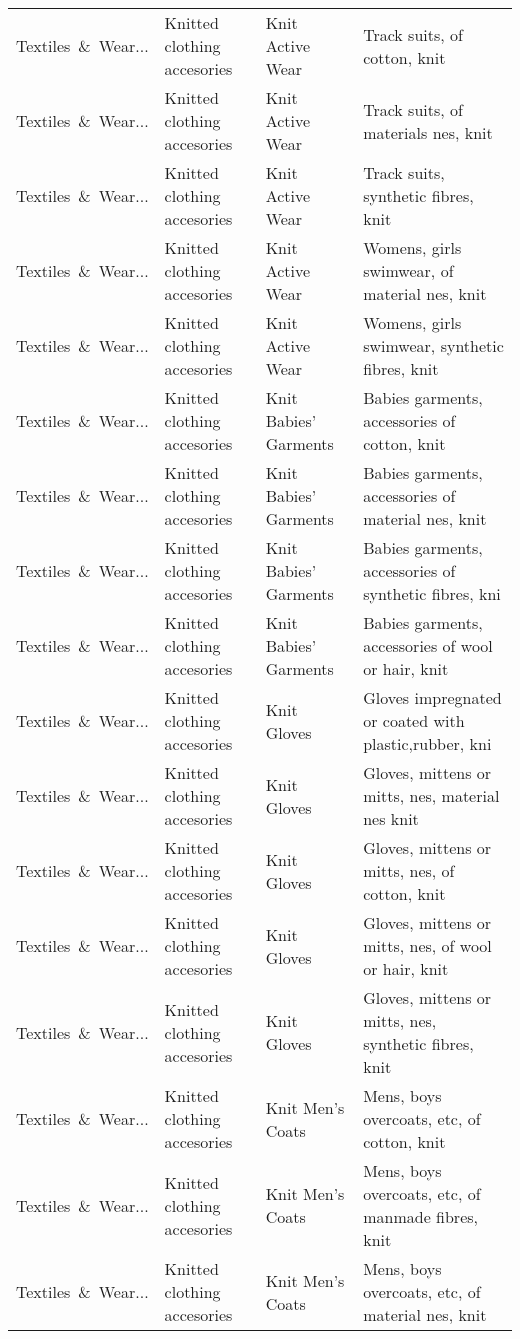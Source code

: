 \begin{appendices}
\begin{xltabular}{\textwidth}{|p{0.10\textwidth}|p{0.25\textwidth}|p{0.24\textwidth}|p{0.31\textwidth}|}
Textiles\ \&\ Wear... & Knitted clothing accesories & Knit Active Wear & Track suits, of cotton, knit \\
Textiles\ \&\ Wear... & Knitted clothing accesories & Knit Active Wear & Track suits, of materials nes, knit \\
Textiles\ \&\ Wear... & Knitted clothing accesories & Knit Active Wear & Track suits, synthetic fibres, knit \\
Textiles\ \&\ Wear... & Knitted clothing accesories & Knit Active Wear & Womens, girls swimwear, of material nes, knit \\
Textiles\ \&\ Wear... & Knitted clothing accesories & Knit Active Wear & Womens, girls swimwear, synthetic fibres, knit \\
Textiles\ \&\ Wear... & Knitted clothing accesories & Knit Babies' Garments & Babies garments, accessories of cotton, knit \\
Textiles\ \&\ Wear... & Knitted clothing accesories & Knit Babies' Garments & Babies garments, accessories of material nes, knit \\
Textiles\ \&\ Wear... & Knitted clothing accesories & Knit Babies' Garments & Babies garments, accessories of synthetic fibres, kni \\
Textiles\ \&\ Wear... & Knitted clothing accesories & Knit Babies' Garments & Babies garments, accessories of wool or hair, knit \\
Textiles\ \&\ Wear... & Knitted clothing accesories & Knit Gloves & Gloves impregnated or coated with plastic,rubber, kni \\
Textiles\ \&\ Wear... & Knitted clothing accesories & Knit Gloves & Gloves, mittens or mitts, nes, material nes knit \\
Textiles\ \&\ Wear... & Knitted clothing accesories & Knit Gloves & Gloves, mittens or mitts, nes, of cotton, knit \\
Textiles\ \&\ Wear... & Knitted clothing accesories & Knit Gloves & Gloves, mittens or mitts, nes, of wool or hair, knit \\
Textiles\ \&\ Wear... & Knitted clothing accesories & Knit Gloves & Gloves, mittens or mitts, nes, synthetic fibres, knit \\
Textiles\ \&\ Wear... & Knitted clothing accesories & Knit Men's Coats & Mens, boys overcoats, etc, of cotton, knit \\
Textiles\ \&\ Wear... & Knitted clothing accesories & Knit Men's Coats & Mens, boys overcoats, etc, of manmade fibres, knit \\
Textiles\ \&\ Wear... & Knitted clothing accesories & Knit Men's Coats & Mens, boys overcoats, etc, of material nes, knit \\

\end{xltabular}
\end{appendices}
